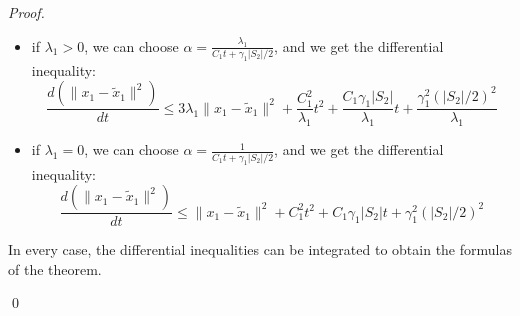 \begin{proof}
\begin{itemize}
\item if $\lambda_1 >0$, we can choose $\alpha = \frac{ \lambda_1
  }{C_1 t + \gamma_1 |S_2|/2}$, and we get the differential
  inequality:
$$\frac{d (\| x_1 - \tilde x_1 \|^2)}{dt}  \leq 3\lambda_1 \|x_1 - \tilde x_1 \|^2  + \frac{C_1^2}{\lambda_1} t^2 + \frac{C_1 \gamma_1 |S_2|}{\lambda_1}t  + \frac{\gamma_1 ^2 (|S_2|/2)^2}{\lambda_1}$$
\item if $\lambda_1 =0$, we can choose $\alpha = \frac{ 1 }{C_1 t +
    \gamma_1 |S_2|/2}$, and we get the differential inequality:
$$\frac{d (\| x_1 - \tilde x_1 \|^2)}{dt}  \leq \|x_1 - \tilde x_1 \|^2  + {C_1^2} t^2 + {C_1 \gamma_1 |S_2|}t  + {\gamma_1 ^2 (|S_2|/2)^2}$$
\end{itemize}

In every case, the differential inequalities can be integrated to
obtain the formulas of the theorem.

\qed
 \end{proof}
%

